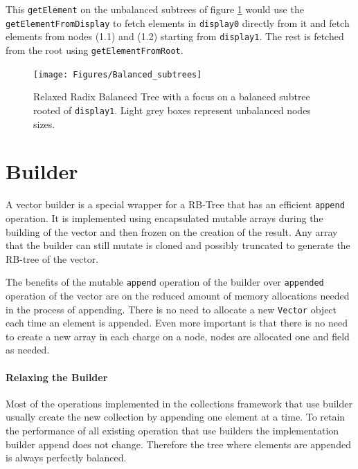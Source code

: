 This \texttt{getElement} on the unbalanced subtrees of figure \ref{Balanced_subtrees}  would use the \texttt{getElementFromDisplay} to fetch elements in \texttt{display0} directly from it and fetch elements from nodes (1.1) and (1.2) starting from \texttt{display1}. The rest is fetched from the root using \texttt{getElementFromRoot}.

\begin{figure}[h!]
  \centering
  \texttt{[image: Figures/Balanced\_subtrees]}
  \caption{Relaxed Radix Balanced Tree with a focus on a balanced subtree rooted of \texttt{display1}. Light grey boxes represent unbalanced nodes sizes.}
  \label{Balanced_subtrees}
\end{figure}


\clearpage
\section{Builder}
A vector builder is a special wrapper for a RB-Tree that has an efficient \texttt{append} operation. It is implemented using encapsulated mutable arrays during the building of the vector and then frozen on the creation of the result. Any array that the builder can still mutate is cloned and possibly truncated to generate the RB-tree of the vector. 

The benefits of the mutable \texttt{append} operation of the builder over \texttt{appended} operation of the vector are on the reduced amount of memory allocations needed in the process of appending. There is no need to allocate a new \texttt{Vector} object each time an element is appended. Even more important is that there is no need to create a new array in each charge on a node, nodes are allocated one and field as needed. 

\paragraph{Relaxing the Builder}
Most of the operations implemented in the collections framework that use builder usually create the new collection by appending one element at a time. To retain the performance of all existing operation that use builders the implementation builder append does not change. Therefore the tree where elements are appended is always perfectly balanced.
 

